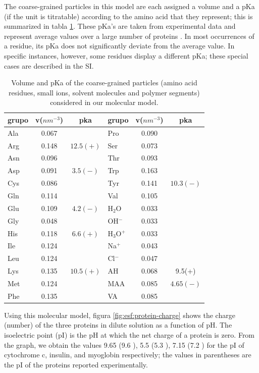  

The coarse-grained particles in this model are each assigned a volume and a pKa (if the unit is titratable) according to the amino acid that they represent; 
this is summarized in  tabla \ref{table:Coarse-grain}.
These pKa's are taken from experimental data and represent average values over a large number of proteins .
In most occurrences of a residue, its pKa does not significantly deviate from the average value.
In  specific instances, however, some residues display a different pKa;
these special cases are described in the SI.


\begin{table}
\centering
\small
\begin{tabular}{|lcc|lcc|}
\hline
grupo & v($nm^{-3}$) & pka & grupo & v($nm^{-3}$) & pka \\
\hline
Ala & 0.067 &  & Pro & 0.090 & \\
Arg & 0.148 & $12.5 (+)$& Ser & 0.073 &\\
Asn & 0.096 &  & Thr & 0.093 & \\
Asp & 0.091 & $3.5 (-)$ & Trp & 0.163 &\\
Cys & 0.086 &  & Tyr & 0.141 & $10.3 (-)$\\
Gln & 0.114 & & Val & 0.105 &\\  
Glu & 0.109 & $4.2 (-)$ & H$_2$O & 0.033 & \\ 
Gly & 0.048 &  & OH$^-$ & 0.033 & \\
His & 0.118 & $6.6 (+)$& H$_3$O$^+$ & 0.033 &  \\ 
Ile & 0.124 &  & Na$^+$ & 0.043 & \\ %
Leu & 0.124 &  & Cl$^-$ & 0.047 & \\
Lys & 0.135 & $10.5 (+)$ & AH & 0.068 &  9.5(+)\\
Met & 0.124 & & MAA & 0.085 & $4.65(-)$\\
Phe & 0.135 &   & VA & 0.085 & \\
\hline
\end{tabular}
\caption{Volume and pKa of the coarse-grained particles (amino acid residues, small ions, solvent molecules and polymer segments)  considered in our molecular model.}
\label{table:Coarse-grain} 
\end{table}


Using this molecular model,  figura \ref{fig:esf:protein-charge} shows the charge (number) of the three proteins in dilute solution as a function of  pH.
The isoelectric point (pI) is the pH at which the net charge of a protein is zero.
From the graph, we obtain the values  9.65 (9.6 ), 5.5 (5.3 ), 7.15 (7.2 ) for the pI of cytochrome c, insulin, and myoglobin respectively;
the values in parentheses are the pI of the proteins reported experimentally. 


